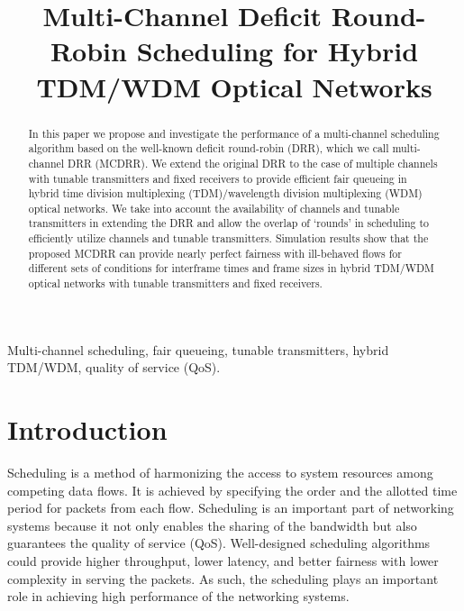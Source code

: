 \documentclass[conference,letterpaper]{IEEEtran}
\begin{document}
\title{Multi-Channel Deficit Round-Robin Scheduling for Hybrid TDM/WDM Optical
  Networks}

\author{
  }

\maketitle




\begin{abstract}
  In this paper we propose and investigate the performance of a multi-channel
  scheduling algorithm based on the well-known deficit round-robin (DRR), which
  we call multi-channel DRR (MCDRR). We extend the original DRR to the case of
  multiple channels with tunable transmitters and fixed receivers to provide
  efficient fair queueing in hybrid time division multiplexing (TDM)/wavelength
  division multiplexing (WDM) optical networks. We take into account the
  availability of channels and tunable transmitters in extending the DRR and
  allow the overlap of `rounds' in scheduling to efficiently utilize channels
  and tunable transmitters. Simulation results show that the proposed MCDRR can
  provide nearly perfect fairness with ill-behaved flows for different sets of
  conditions for interframe times and frame sizes in hybrid TDM/WDM optical
  networks with tunable transmitters and fixed receivers.
\end{abstract}

\begin{IEEEkeywords}
  Multi-channel scheduling, fair queueing, tunable transmitters, hybrid TDM/WDM,
  quality of service (QoS).
\end{IEEEkeywords}



\section{Introduction}
Scheduling is a method of harmonizing the access to system resources among
competing data flows. It is achieved by specifying the order and the allotted
time period for packets from each flow. Scheduling is an important part of
networking systems because it not only enables the sharing of the bandwidth but
also guarantees the quality of service (QoS). Well-designed scheduling
algorithms could provide higher throughput, lower latency, and better fairness
with lower complexity in serving the packets. As such, the scheduling plays an
important role in achieving high performance of the networking systems.
\end{document}
